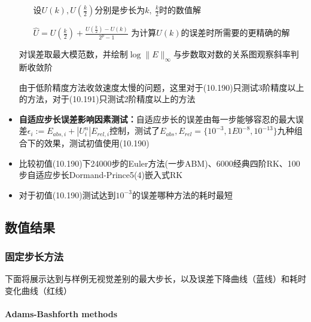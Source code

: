 \documentclass{article}
\begin{document}
\begin{itemize}
\begin{itemize}
        设$U(k),U(\frac{k}{2})$分别是步长为$k,\ \frac{k}{2}$时的数值解
        
        $\hat{U} = U({\frac{k}{2}})+\frac{U({\frac{k}{2}})-U(k)}{2^p-1}$
        为计算$U(k)$的误差时所需要的更精确的解
    \end{itemize}
    对误差取最大模范数，并绘制$\log \|E\|_{\infty}$与步数取对数的关系图观察斜率判断收敛阶
    
    由于低阶精度方法收敛速度太慢的问题，这里对于(10.190)只测试3阶精度以上的方法，对于(10.191)只测试2阶精度以上的方法
    \item \textbf{自适应步长误差影响因素测试：}自适应步长的误差由每一步能够容忍的最大误差$\epsilon_i:=E_{abs,i}+|U_i^n|E_{rel,i}$控制，测试了$E_{abs},E_{rel}=\{10^{-3},1E0^{-8},10^{-13}\}$九种组合下的效果，测试初值使用(10.190)
    \item 比较初值(10.190)下24000步的Euler方法(一步ABM)、6000经典四阶RK、100步自适应步长Dormand-Prince5(4)嵌入式RK
    \item 对于初值(10.190)测试达到$10^{-3}$的误差哪种方法的耗时最短
\end{itemize}

\subsection{数值结果}

\subsubsection{固定步长方法}
下面将展示达到与样例无视觉差别的最大步长，以及误差下降曲线（蓝线）和耗时变化曲线（红线）
\paragraph{Adams-Bashforth methods}
\end{document}
